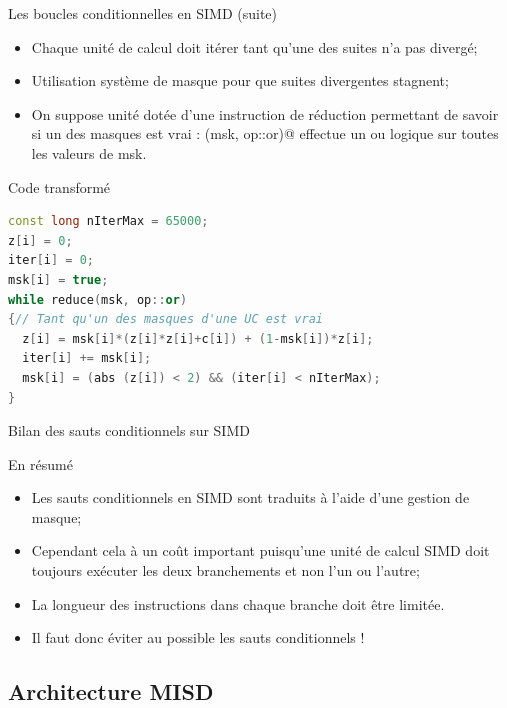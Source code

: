 \documentclass[handout]{beamer}
\begin{document}
\begin{frame}[fragile]{Les boucles conditionnelles en SIMD (suite)}

\begin{itemize}
\item Chaque unité de calcul doit itérer tant qu'une des suites n'a pas divergé;
\item Utilisation système de masque pour que suites divergentes stagnent;
\item On suppose unité dotée d'une instruction de réduction permettant de savoir si un des
masques est vrai : \lstinline@reduce(msk, op::or)@ effectue un ou logique sur toutes les
valeurs de msk.
\end{itemize}

\begin{alertblock}{Code transformé}

\begin{lstlisting}[language=C++]
const long nIterMax = 65000;
z[i] = 0;
iter[i] = 0;
msk[i] = true;
while reduce(msk, op::or) 
{// Tant qu'un des masques d'une UC est vrai
  z[i] = msk[i]*(z[i]*z[i]+c[i]) + (1-msk[i])*z[i];
  iter[i] += msk[i];
  msk[i] = (abs (z[i]) < 2) && (iter[i] < nIterMax);
}
\end{lstlisting}
\end{alertblock}
\end{frame}

\begin{frame}[fragile]{Bilan des sauts conditionnels sur SIMD}
 
 \begin{block}{En résumé}
 \begin{itemize}
  \item Les sauts conditionnels en SIMD sont traduits à l'aide d'une gestion de masque;
  \item Cependant cela à un coût important puisqu'une unité de calcul SIMD doit toujours exécuter
        les deux branchements et non l'un ou l'autre;
   \item La longueur des instructions dans chaque branche doit être limitée.
   \item Il faut donc éviter au possible les sauts conditionnels !
 \end{itemize}
 \end{block}

\end{frame}

\subsection{Architecture MISD}
\end{document}
